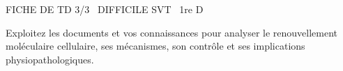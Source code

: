 \documentclass[11pt]{article}
\begin{document}
\begin{tcolorbox}[enhanced,colback=popink,colframe=popink,arc=10pt,boxrule=0pt,left=12pt,right=12pt,top=9pt,bottom=9pt]
{\color{white}\popxbold\small FICHE DE TD 3/3 \textbullet\ DIFFICILE \hfill SVT \textbullet\ 1re D\par}
\end{tcolorbox}
\vspace{4pt}
\noindent Exploitez les documents et vos connaissances pour analyser le renouvellement moléculaire cellulaire, ses mécanismes, son contrôle et ses implications physiopathologiques.
\end{document}
